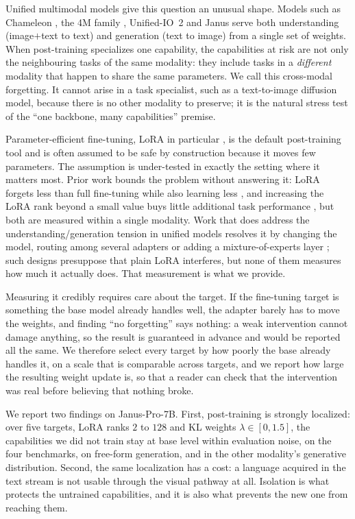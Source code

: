 \documentclass{article}
\begin{document}
Unified multimodal models give this question an unusual shape. Models such as
Chameleon \citep{chameleon2024}, the 4M family \citep{bachmann20244m21},
Unified-IO~2 \citep{lu2024unifiedio2} and Janus \citep{wu2024janus, januspro}
serve both understanding (image$+$text to text) and generation (text to image)
from a single set of weights. When post-training specializes one capability, the
capabilities at risk are not only the neighbouring tasks of the same modality:
they include tasks in a \emph{different} modality that happen to share the same
parameters. We call this cross-modal forgetting. It cannot arise in a task
specialist, such as a text-to-image diffusion model, because there is no other
modality to preserve; it is the natural stress test of the ``one backbone, many
capabilities'' premise.

Parameter-efficient fine-tuning, LoRA in particular \citep{hu2022lora}, is the
default post-training tool and is often assumed to be safe by construction
because it moves few parameters. The assumption is under-tested in exactly the
setting where it matters most. Prior work bounds the problem without answering
it: LoRA forgets less than full fine-tuning while also learning less
\citep{biderman2024lora}, and increasing the LoRA rank beyond a small value buys
little additional task performance \citep{zhang2024scalingmeetsfinetuning}, but
both are measured within a single modality. Work that does address the
understanding/generation tension in unified models resolves it by changing the
model, routing among several adapters or adding a mixture-of-experts layer
\citep{dou2024loramoe}; such designs presuppose that plain LoRA interferes, but
none of them measures how much it actually does. That measurement is what we
provide.

Measuring it credibly requires care about the target. If the fine-tuning target
is something the base model already handles well, the adapter barely has to move
the weights, and finding ``no forgetting'' says nothing: a weak intervention
cannot damage anything, so the result is guaranteed in advance and would be
reported all the same. We therefore select every target by how poorly the base
already handles it, on a scale that is comparable across targets, and we report
how large the resulting weight update is, so that a reader can check that the
intervention was real before believing that nothing broke.

We report two findings on Janus-Pro-7B. First, post-training is strongly
localized: over five targets, LoRA ranks $2$ to $128$ and KL weights
$\lambda\in[0,1.5]$, the capabilities we did not train stay at base level within
evaluation noise, on the four benchmarks, on free-form generation, and in the
other modality's generative distribution. Second, the same localization has a
cost: a language acquired in the text stream is not usable through the visual
pathway at all. Isolation is what protects the untrained capabilities, and it is
also what prevents the new one from reaching them.
\end{document}

